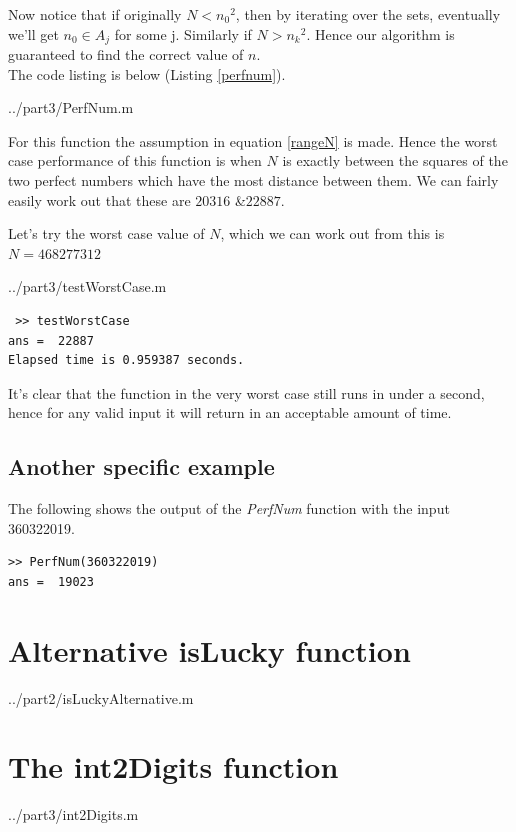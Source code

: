 \documentclass[10pt]{article}
\begin{document}
Now notice that if originally $N < {n_0}^2$, then by iterating over the sets, eventually we'll get $n_0 \in A_j$ for some j. Similarly if $N > {n_k}^2$. Hence our algorithm is guaranteed to find the correct value of $n$. \\

The code listing is below (Listing \ref{perfnum}).

  {../part3/PerfNum.m}
 
For this function the assumption in equation \ref{rangeN} is made. Hence the worst case performance of this function is when $N$ is exactly between the squares of the two perfect numbers which have the most distance between them. We can fairly easily work out that these are $20316$ \&$22887$. 

Let's try the worst case value of $N$, which we can work out from this is $ N = 468277312 $

   {../part3/testWorstCase.m}
  
 \begin{verbatim}
 >> testWorstCase
ans =  22887
Elapsed time is 0.959387 seconds.
\end{verbatim}

It's clear that the function in the very worst case still runs in under a second, hence for any valid input it will return in an acceptable amount of time.

\subsection{Another specific example}

The following shows the output of the \emph{PerfNum} function with the input 360322019.

\begin{verbatim}
>> PerfNum(360322019)
ans =  19023
\end{verbatim}
\begin{appendices}


\section{Alternative isLucky function}\label{islucky_appendix}

   {../part2/isLuckyAlternative.m}
  
\section{The int2Digits function}

   {../part3/int2Digits.m}

\end{appendices}
\end{document}
